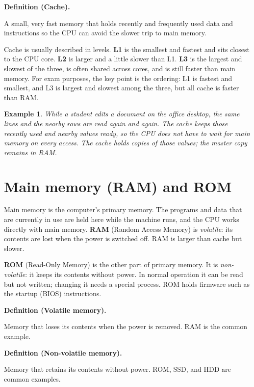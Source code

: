 \documentclass[11pt]{article}
\newtheorem{example}{Example}[section]
\newenvironment{definitionbox}[1]{%
  \par\noindent\textbf{Definition (#1).}\ \itshape
}{\par\vspace{0.3em}}
\begin{document}
\begin{definitionbox}{Cache}
A small, very fast memory that holds recently and frequently used data and
instructions so the CPU can avoid the slower trip to main memory.
\end{definitionbox}

Cache is usually described in levels. \textbf{L1} is the smallest and
fastest and sits closest to the CPU core. \textbf{L2} is larger and a little
slower than L1. \textbf{L3} is the largest and slowest of the three, is
often shared across cores, and is still faster than main memory. For exam
purposes, the key point is the ordering: L1 is fastest and smallest, and L3
is largest and slowest among the three, but all cache is faster than RAM.

\begin{example}
While a student edits a document on the office desktop, the same lines and
the nearby rows are read again and again. The cache keeps those recently
used and nearby values ready, so the CPU does not have to wait for main
memory on every access. The cache holds copies of those values; the master
copy remains in RAM.
\end{example}

\section{Main memory (RAM) and ROM}
Main memory is the computer's primary memory. The programs and data that
are currently in use are held here while the machine runs, and the CPU works
directly with main memory. \textbf{RAM} (Random Access Memory) is
\emph{volatile}: its contents are lost when the power is switched off. RAM
is larger than cache but slower.

\textbf{ROM} (Read-Only Memory) is the other part of primary memory. It is
\emph{non-volatile}: it keeps its contents without power. In normal
operation it can be read but not written; changing it needs a special
process. ROM holds firmware such as the startup (BIOS) instructions.

\begin{definitionbox}{Volatile memory}
Memory that loses its contents when the power is removed. RAM is the common
example.
\end{definitionbox}

\begin{definitionbox}{Non-volatile memory}
Memory that retains its contents without power. ROM, SSD, and HDD are common
examples.
\end{definitionbox}
\end{document}
